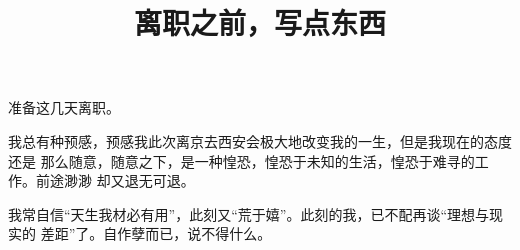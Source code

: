 \documentclass[cn,pad]{elegantbook}
\title{离职之前，写点东西}
\begin{document}
	准备这几天离职。
	
	我总有种预感，预感我此次离京去西安会极大地改变我的一生，但是我现在的态度还是
	那么随意，随意之下，是一种惶恐，惶恐于未知的生活，惶恐于难寻的工作。前途渺渺
	却又退无可退。
	
	我常自信“天生我材必有用”，此刻又“荒于嬉”。此刻的我，已不配再谈“理想与现实的
	差距”了。自作孽而已，说不得什么。
	
	
\end{document}
